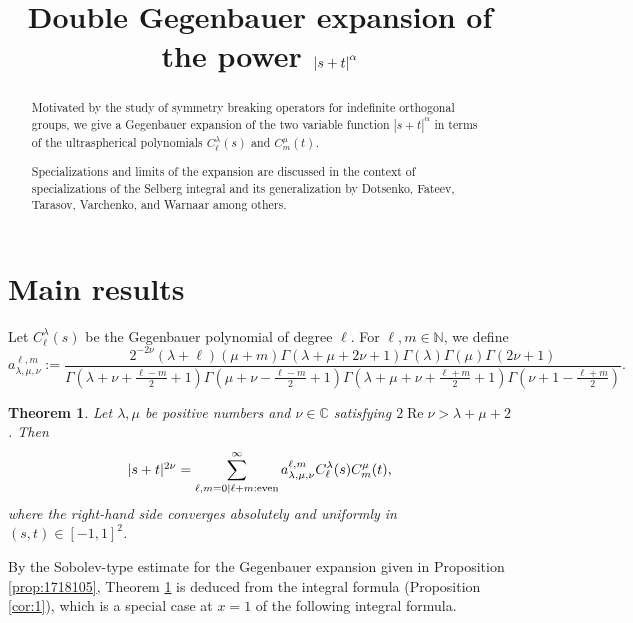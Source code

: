 \documentclass[12pt]{article}
\title{Double Gegenbauer expansion of the power $\left|s+t\right|^\alpha$}
\newcommand{\N}{\mathbb{N}}
\newcommand{\C}{\mathbb{C}}
\renewcommand{\Re}{\operatorname{Re}}
\numberwithin{equation}{section}
\newcommand{\assign}{:=}
\newcommand{\tmop}[1]{\ensuremath{\operatorname{#1}}}
\newtheorem{theorem}[corollary]{Theorem}
\newcommand{\mygrammarfootnote}[1]{}
\begin{document}
\maketitle

\begin{abstract}
  Motivated by the study of symmetry breaking operators for indefinite
  orthogonal groups, we give a Gegenbauer expansion of the two variable
  function $| s + t |^{\alpha}$ in terms of the ultraspherical polynomials
  $C_{\ell}^{\lambda} (s)$ and $C^{\mu}_m (t)$.
  
  Specializations and limits of the expansion are discussed in the context of
  specializations of the Selberg integral and its
  generalization\mygrammarfootnote{maybe, ``generalization'' should be in plural (i.e.
  ``generalizations'')?} by Dotsenko, Fateev, Tarasov, Varchenko, and Warnaar
  among others.
\end{abstract}

\section{Main results}

Let $C_{\ell}^{\lambda} (s)$ be the Gegenbauer polynomial of degree $\ell$. For $\ell,m\in\N$, we define
\begin{equation*}
     \displaystyle a_{\lambda, \mu, \nu}^{\ell, m} \assign \frac{2^{- 2 \nu} (\lambda + \ell)
    (\mu + m) \Gamma (\lambda + \mu + 2 \nu + 1) \Gamma (\lambda) \Gamma (\mu)
    \Gamma (2 \nu + 1)}{\Gamma \left( \lambda + \nu + \frac{\ell - m}{2} + 1
    \right) \Gamma \left( \mu + \nu - \frac{\ell - m}{2} + 1 \right) \Gamma
    \left( \lambda + \mu + \nu + \frac{\ell + m}{2} + 1 \right) \Gamma \left(
    \nu + 1 - \frac{\ell + m}{2} \right)} .
\end{equation*}
\begin{theorem}
	\label{thm:1-1}
	Let $\lambda,\mu$ be positive numbers and $\nu\in\C$ satisfying $2\Re \nu>\lambda+\mu+2$. Then
  \begin{equation*}
	  \begin{array}[]{c}
     | s + t |^{2 \nu} = \displaystyle\sum_{\ell, m = 0 \mid \ell + m :
    \tmop{even}}^{\infty} a_{\lambda, \mu, \nu}^{\ell, m} C_{\ell}^{\lambda}
    (s) C_m^{\mu} (t), \\
	  \end{array}
  \end{equation*}
  where the right-hand side converges absolutely and uniformly in $(s,t)\in[-1,1]^2$.
\end{theorem}
By the Sobolev-type estimate for the Gegenbauer expansion given in Proposition \ref{prop:1718105},
Theorem \ref{thm:1-1} is deduced from the integral formula (Proposition \ref{cor:1}),
which is a special case at $x=1$ of the following integral formula.
\end{document}
